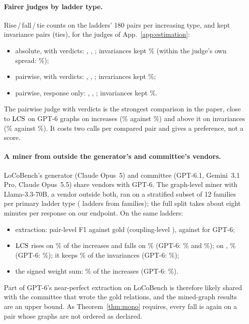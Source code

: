 \paragraph{Fairer judges by ladder type.} Rise\,/\,fall\,/\,tie counts on the \sThreeNConflict{}
ladders' 180 pairs per increasing type, and kept invariance pairs (ties), for the judges of
App.~\ref{app:estimation}:
\begin{itemize}[leftmargin=1.2em,itemsep=1pt,topsep=2pt]
\item absolute, with verdicts:  \fjAbsConflictCounts,  \fjAbsChainCounts,
   \fjAbsSignCounts; invariances kept \fjAbsInvTie\% (within the judge's own spread:
  \fjAbsInvSpreadRise\%);
\item pairwise, with verdicts:  \fjPairVConflictCounts,  \fjPairVChainCounts,
   \fjPairVSignCounts; invariances kept \fjPairVInvTie\%;
\item pairwise, response only:  \fjPairConflictCounts,  \fjPairChainCounts,
   \fjPairSignCounts; invariances kept \fjPairInvTie\%.
\end{itemize}
The pairwise judge with verdicts is the strongest comparison in the paper, close to $\mathrm{LCS}$ on GPT-6
graphs on increases (\fjPairVIncRise\% against \sThreeGraphGptLamIncPct\%) and above it on
invariances (\fjPairVInvTie\% against \sThreeGraphGptLamInvPct\%). It costs two calls per compared
pair and gives a preference, not a score.

\paragraph{A miner from outside the generator's and committee's vendors.} LoCoBench's generator
(Claude Opus~5) and committee (GPT-6.1, Gemini~3.1 Pro, Claude Opus~5.5) share vendors with GPT-6.
The graph-level miner with Llama-3.3-70B, a vendor outside both, ran on a stratified subset of 12
families per primary ladder type (\subLadders{} ladders from \subFamilies{} families); the full split
takes about eight minutes per response on our endpoint. On the same ladders:
\begin{itemize}[leftmargin=1.2em,itemsep=1pt,topsep=2pt]
\item extraction: pair-level F1 against gold \subLlamaPairF{} (coupling-level \subLlamaCoupF), against
  \subGptPairF{} for GPT-6;
\item $\mathrm{LCS}$ rises on \subLlamaLcsInc\% of the \subLlamaLcsNInc{} increases and falls on
  \subLlamaLcsFalls\% (GPT-6: \subGptLcsInc\% and \subGptLcsFalls\%); on , \subLlamaLcsChain\%
  (GPT-6: \subGptLcsChain\%); it keeps \subLlamaLcsInv\% of the invariances (GPT-6: \subGptLcsInv\%);
\item the signed weight sum: \subLlamaWsumInc\% of the increases (GPT-6: \subGptWsumInc\%).
\end{itemize}
Part of GPT-6's near-perfect extraction on LoCoBench is therefore likely shared with the committee
that wrote the gold relations, and the mined-graph results are an upper bound. As
Theorem~\ref{thm:mono} requires, every fall is again on a pair whose graphs are not ordered as
declared.

